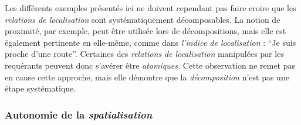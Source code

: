 Les différents exemples présentés ici ne doivent cependant pas faire
croire que les \emph{relations de localisation} sont systématiquement
décomposables. La notion de proximité, par exemple, peut être utilisée
lors de décompositions, mais elle est également pertinente en
elle-même, comme dans \emph{l'indice de localisation} : \enquote{Je
  suis proche d'une route}. Certaines des \emph{relations de
  localisation} manipulées par les requérants peuvent donc s’avérer
être \emph{atomiques.} Cette observation ne remet pas en cause cette
approche, mais elle démontre que la \emph{décomposition} n'est pas une
étape systématique.


\subsubsection{Autonomie de la \emph{spatialisation}}

